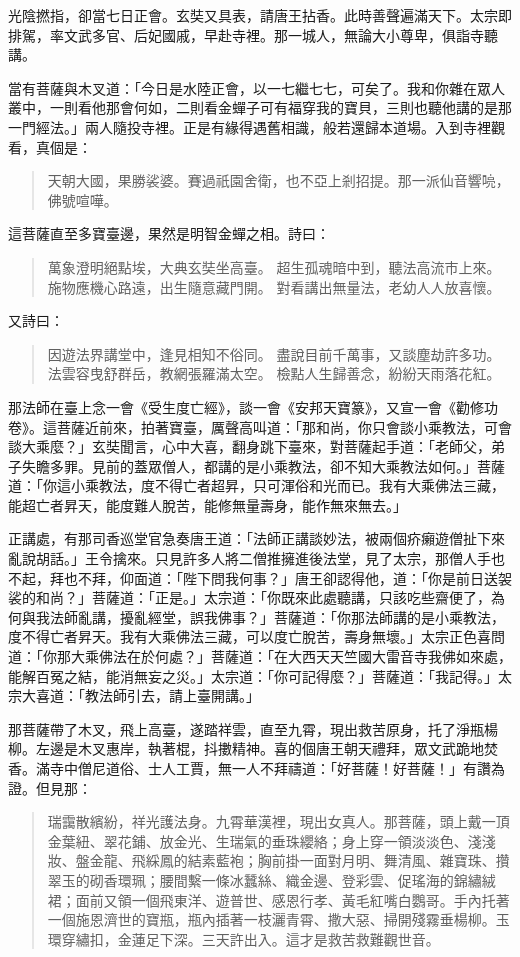 光陰撚指，卻當七日正會。玄奘又具表，請唐王拈香。此時善聲遍滿天下。太宗即排駕，率文武多官、后妃國戚，早赴寺裡。那一城人，無論大小尊卑，俱詣寺聽講。

當有菩薩與木叉道：「今日是水陸正會，以一七繼七七，可矣了。我和你雜在眾人叢中，一則看他那會何如，二則看金蟬子可有福穿我的寶貝，三則也聽他講的是那一門經法。」兩人隨投寺裡。正是有緣得遇舊相識，般若還歸本道場。入到寺裡觀看，真個是：
\begin{quote}
天朝大國，果勝裟婆。賽過祇園舍衛，也不亞上剎招提。那一派仙音響喨，佛號喧嘩。
\end{quote}

這菩薩直至多寶臺邊，果然是明智金蟬之相。詩曰：
\begin{quote}
萬象澄明絕點埃，大典玄奘坐高臺。
超生孤魂暗中到，聽法高流市上來。
施物應機心路遠，出生隨意藏門開。
對看講出無量法，老幼人人放喜懷。
\end{quote}

又詩曰：
\begin{quote}
因遊法界講堂中，逢見相知不俗同。
盡說目前千萬事，又談塵劫許多功。
法雲容曳舒群岳，教網張羅滿太空。
檢點人生歸善念，紛紛天雨落花紅。
\end{quote}

那法師在臺上念一會《受生度亡經》，談一會《安邦天寶篆》，又宣一會《勸修功卷》。這菩薩近前來，拍著寶臺，厲聲高叫道：「那和尚，你只會談小乘教法，可會談大乘麼？」玄奘聞言，心中大喜，翻身跳下臺來，對菩薩起手道：「老師父，弟子失瞻多罪。見前的蓋眾僧人，都講的是小乘教法，卻不知大乘教法如何。」菩薩道：「你這小乘教法，度不得亡者超昇，只可渾俗和光而已。我有大乘佛法三藏，能超亡者昇天，能度難人脫苦，能修無量壽身，能作無來無去。」

正講處，有那司香巡堂官急奏唐王道：「法師正講談妙法，被兩個疥癩遊僧扯下來亂說胡話。」王令擒來。只見許多人將二僧推擁進後法堂，見了太宗，那僧人手也不起，拜也不拜，仰面道：「陛下問我何事？」唐王卻認得他，道：「你是前日送袈裟的和尚？」菩薩道：「正是。」太宗道：「你既來此處聽講，只該吃些齋便了，為何與我法師亂講，擾亂經堂，誤我佛事？」菩薩道：「你那法師講的是小乘教法，度不得亡者昇天。我有大乘佛法三藏，可以度亡脫苦，壽身無壞。」太宗正色喜問道：「你那大乘佛法在於何處？」菩薩道：「在大西天天竺國大雷音寺我佛如來處，能解百冤之結，能消無妄之災。」太宗道：「你可記得麼？」菩薩道：「我記得。」太宗大喜道：「教法師引去，請上臺開講。」

那菩薩帶了木叉，飛上高臺，遂踏祥雲，直至九霄，現出救苦原身，托了淨瓶楊柳。左邊是木叉惠岸，執著棍，抖擻精神。喜的個唐王朝天禮拜，眾文武跪地焚香。滿寺中僧尼道俗、士人工賈，無一人不拜禱道：「好菩薩！好菩薩！」有讚為證。但見那：
\begin{quote}
瑞靄散繽紛，祥光護法身。九霄華漢裡，現出女真人。那菩薩，頭上戴一頂金葉紐、翠花鋪、放金光、生瑞氣的垂珠纓絡；身上穿一領淡淡色、淺淺妝、盤金龍、飛綵鳳的結素藍袍；胸前掛一面對月明、舞清風、雜寶珠、攢翠玉的砌香環珮；腰間繫一條冰蠶絲、織金邊、登彩雲、促瑤海的錦繡絨裙；面前又領一個飛東洋、遊普世、感恩行孝、黃毛紅嘴白鸚哥。手內托著一個施恩濟世的寶瓶，瓶內插著一枝灑青霄、撒大惡、掃開殘霧垂楊柳。玉環穿繡扣，金蓮足下深。三天許出入。這才是救苦救難觀世音。
\end{quote}

